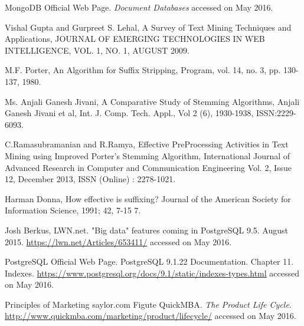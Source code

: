 \begin{thebibliography}{99999}
 MongoDB Official Web Page. \textit{Document Databases} accessed on May 2016.

 Vishal Gupta and Gurpreet S. Lehal, A Survey of Text Mining Techniques and Applications, JOURNAL OF EMERGING TECHNOLOGIES IN WEB INTELLIGENCE, VOL. 1, NO. 1, AUGUST 2009. 

  M.F. Porter, An Algorithm for Suffix Stripping, Program, vol. 14, no. 3, pp. 130-137, 1980.

 Ms. Anjali Ganesh Jivani, A Comparative Study of Stemming Algorithms, Anjali Ganesh Jivani et al, Int. J. Comp. Tech. Appl., Vol 2 (6), 1930-1938, ISSN:2229-6093.

 C.Ramasubramanian and R.Ramya, Effective PreProcessing Activities in Text Mining using Improved Porter's Stemming Algorithm, International Journal of Advanced Research in Computer and Communication Engineering Vol. 2, Issue 12, December 2013, ISSN (Online) : 2278-1021. 

 Harman Donna, How effective is suffixing?
Journal of the American Society for Information Science, 1991; 42, 7-15 7.

 Josh Berkus, LWN.net. "Big data" features coming in PostgreSQL 9.5. August 2015. \url{https://lwn.net/Articles/653411/} accessed on May 2016. 


 PostgreSQL Official Web Page. PostgreSQL 9.1.22 Documentation. Chapter 11. Indexes. \url{https://www.postgresql.org/docs/9.1/static/indexes-types.html} accessed on May 2016.

 Principles of Marketing saylor.com
 Figute 
 QuickMBA. \textit{The Product Life Cycle.} \url{http://www.quickmba.com/marketing/product/lifecycle/} accessed on May 2016.

\end{thebibliography}
